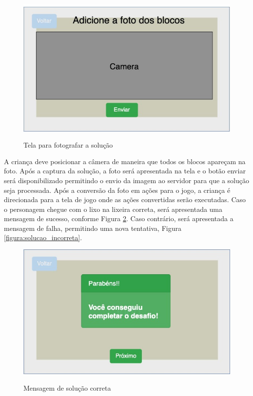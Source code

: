     \begin{figure}[H]
        \caption{Tela para fotografar a solução}
        \centering
        \includegraphics[width=\linewidth]{Imagens/Cap3/UploadSolucao.jpg}
        \label{figura:fotografar_blocos}
    \end{figure}
    
    A criança deve posicionar a câmera de maneira que todos os blocos apareçam na foto. Após a captura da solução, a foto será apresentada na tela e o botão enviar será disponibilizado permitindo o envio da imagem ao servidor para que a solução seja processada.
    Após a conversão da foto em ações para o jogo, a criança é direcionada para a tela de jogo onde as ações convertidas serão executadas.
    Caso o personagem chegue com o lixo na lixeira correta, será apresentada uma mensagem de sucesso, conforme Figura \ref{figura:solucao_correta}. Caso contrário, será apresentada a mensagem de falha, permitindo uma nova tentativa, Figura \ref{figura:solucao_incorreta}.
    
    \begin{figure}[H]
        \caption{Mensagem de solução correta}
        \centering
        \includegraphics[width=\linewidth]{Imagens/Cap3/solucao_correta.jpg}
        \label{figura:solucao_correta}
    \end{figure}
    
